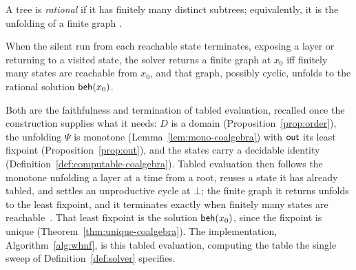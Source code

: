 \begin{definition}[Rational]\label{def:rational}
  A tree is \emph{rational} if it has finitely many distinct subtrees; equivalently, it is the unfolding of a finite graph \cite{courcelle1983-infinite-trees}.
\end{definition}

\begin{theorem}[Termination]\label{thm:termination}
  When the silent run from each reachable state terminates, exposing a layer or returning to a visited state, the solver returns a finite graph at $x_0$ iff finitely many states are reachable from $x_0$, and that graph, possibly cyclic, unfolds to the rational solution $\mathsf{beh}(x_0)$.
\end{theorem}

\noindent Both are the faithfulness and termination of tabled evaluation, recalled once the construction supplies what it needs: $D$ is a domain (Proposition~\ref{prop:order}), the unfolding $\Psi$ is monotone (Lemma~\ref{lem:mono-coalgebra}) with $\mathsf{out}$ its least fixpoint (Proposition~\ref{prop:out}), and the states carry a decidable identity (Definition~\ref{def:computable-coalgebra}). Tabled evaluation then follows the monotone unfolding a layer at a time from a root, reuses a state it has already tabled, and settles an unproductive cycle at $\bot$; the finite graph it returns unfolds to the least fixpoint, and it terminates exactly when finitely many states are reachable~\cite{vanemden-kowalski, tamaki-sato, tabling-slg}. That least fixpoint is the solution $\mathsf{beh}(x_0)$, since the fixpoint is unique (Theorem~\ref{thm:unique-coalgebra}). The implementation, Algorithm~\ref{alg:whnf}, is this tabled evaluation, computing the table the single sweep of Definition~\ref{def:solver} specifies.

